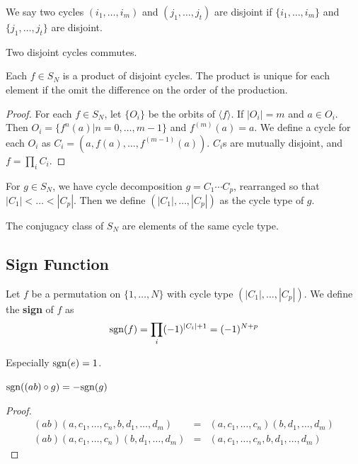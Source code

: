 \documentclass[12pt]{book}
\begin{document}
\begin{definition}
	We say two cycles $(i_1,\dots,i_m)$ and $(j_1,\dots,j_t)$ are disjoint if $\{i_1,\dots,i_m\}$ and $\{j_1,\dots,j_t\}$ are disjoint.
\end{definition}
	\begin{lemma}
		Two disjoint cycles commutes.
	\end{lemma}
	
	\begin{lemma}
		Each $f\in S_N$ is a product of disjoint cycles. The product is unique for each element if the omit the difference on the order of the production.
	\end{lemma}
	\begin{proof}
	For each $f\in S_N$, let $\{O_i\}$ be the orbits of $\langle f\rangle$. If $|O_i|=m$ and $a\in O_i$. Then $O_i=\{f^n(a)|n=0,\dots,m-1\}$ and $f^{(m)}(a)=a$. We define a cycle for each $O_i$ as $C_i=(a,f(a),\dots,f^{(m-1)}(a))$. $C_i$s are mutually disjoint, and $f=\prod_iC_i$.
	\end{proof}
	
	\begin{definition}
		For $g\in S_N$, we have cycle decomposition $g=C_1\cdots C_p$, rearranged so that $|C_1|<\dots<|C_p|$.  Then we define $(|C_1|,\dots,|C_p|)$ as the cycle type of $g$.
	\end{definition}
	
	\begin{theorem}
		The conjugacy class of $S_N$ are elements of the same cycle type.
	\end{theorem}
	
\subsection{Sign Function}
\begin{definition}
	Let $f$ be a permutation on $\{1,\dots,N\}$ with cycle type $(|C_1|,\dots,|C_p|)$. We define the {\bf sign} of $f$ as 
	\begin{equation}
		{\rm sgn}(f)=\prod_i (-1)^{|C_i|+1}=(-1)^{N+p}
	\end{equation}
	
	Especially ${\rm sgn}(e)=1$.
\end{definition}
\begin{lemma}
	${\rm sgn}((ab)\circ g)=-{\rm sgn}(g)$
\end{lemma}
	\begin{proof}
		\begin{eqnarray}
			(ab)(a,c_1,\dots,c_n,b,d_1,\dots,d_m)&=&(a,c_1,\dots,c_n)(b,d_1,\dots,d_m)\\
			(ab)(a,c_1,\dots,c_n)(b,d_1,\dots,d_m)&=&(a,c_1,\dots,c_n,b,d_1,\dots,d_m)
		\end{eqnarray}
	\end{proof}
	
\end{document}
